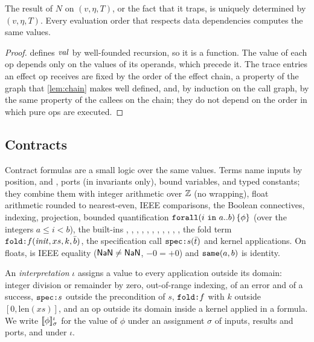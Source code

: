 \begin{proposition}[Determinism]\label{prop:determinism}
The result of $N$ on $(v,\eta,T)$, or the fact that it traps, is uniquely determined by
$(v,\eta,T)$. Every evaluation order that respects data dependencies computes the same values.
\end{proposition}
\begin{proof}
 defines $\mathit{val}$ by well-founded recursion, so it is a function. The value of
each op depends only on the values of its operands, which precede it. The trace entries an
effect op receives are fixed by the order of the effect chain, a property of the graph that
\cref{lem:chain} makes well defined, and, by induction on the call graph, by the same property
of the callees on the chain; they do not depend on the order in which pure ops are executed.
\end{proof}

\subsection{Contracts}\label{sec:contracts}

Contract formulas are a small logic over the same values. Terms name inputs by position,
 and , ports (in invariants only), bound variables, and typed
constants; they combine them with integer arithmetic over $\mathbb{Z}$ (no wrapping), float
arithmetic rounded to nearest-even, IEEE comparisons, the Boolean connectives,
indexing, projection, bounded quantification $\texttt{forall}(i\ \texttt{in}\ a..b)\,\{\phi\}$
(over the integers $a\le i<b$), the built-ins , , ,
, , , , , , , , the
fold term $\texttt{fold:}f(\mathit{init},xs,k,\bar b)$, the specification call
$\texttt{spec:}s(\bar t)$ and kernel applications. On floats, \kw{==} is IEEE equality
($\mathsf{NaN}\neq\mathsf{NaN}$, $-0=+0$) and $\texttt{same}(a,b)$ is identity.

\begin{definition}\label{def:unspecified}
An \emph{interpretation} $\iota$ assigns a value to every application outside its domain:
integer division or remainder by zero, out-of-range indexing,  of an error and 
of a success, $\texttt{spec:}s$ outside the precondition of $s$, $\texttt{fold:}f$ with $k$ outside
$[0,\mathrm{len}(xs)]$, and an op outside its domain inside a kernel applied in a formula. We write
$\llbracket \phi \rrbracket^\iota_\sigma$ for the value of $\phi$ under an assignment $\sigma$ of inputs,
results and ports, and under $\iota$.
\end{definition}

